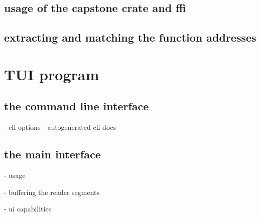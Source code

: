 \subsection{usage of the capstone crate and ffi}

\subsection{extracting and matching the function addresses}

\section{TUI program}

\subsection{the command line interface}

    - cli options
    - autogenerated cli docs

\subsection{the main interface}
- usage

- buffering the reader segments

- ui capabilities


